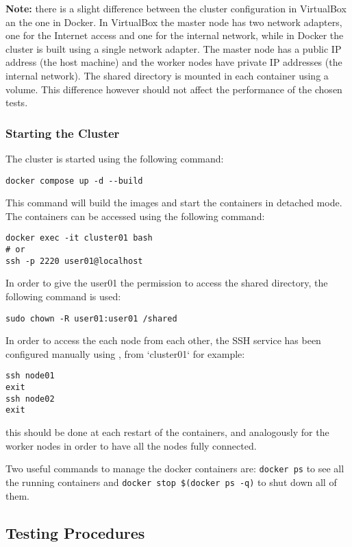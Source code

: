 \textbf{Note:} there is a slight difference between the cluster configuration in VirtualBox an the one in Docker. In VirtualBox the master node has two network adapters, one for the Internet access and one for the internal network, while in Docker the cluster is built using a single network adapter. The master node has a public IP address (the host machine) and the worker nodes have private IP addresses (the internal network). The shared directory is mounted in each container using a volume. This difference however should not affect the performance of the chosen tests.

\subsubsection{Starting the Cluster}
The cluster is started using the following command:

\begin{verbatim}
docker compose up -d --build
\end{verbatim}
This command will build the images and start the containers in detached mode. The containers can be accessed using the following command:
\begin{verbatim}
docker exec -it cluster01 bash
# or
ssh -p 2220 user01@localhost
\end{verbatim}
In order to give the user01 the permission to access the shared directory, the following command is used:

\begin{verbatim}
sudo chown -R user01:user01 /shared
\end{verbatim}

In order to access the each node from each other, the SSH service has been configured manually using , from `cluster01` for example:

\begin{verbatim}
ssh node01
exit
ssh node02
exit
\end{verbatim}

this should be done at each restart of the containers, and analogously for the worker nodes in order to have all the nodes fully connected.

Two useful commands to manage the docker containers are: \texttt{docker ps} to see all the running containers and \texttt{docker stop \$(docker ps -q)} to shut down all of them.




\subsection{Testing Procedures}


